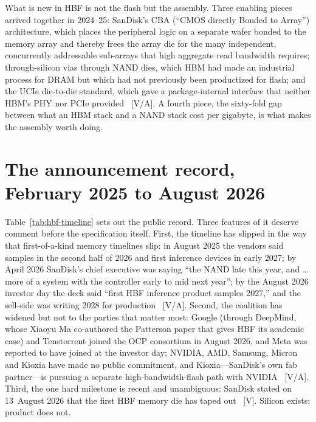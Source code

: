 What is new in HBF is not the flash but the assembly. Three enabling pieces arrived together in 2024--25: SanDisk's CBA (``CMOS directly Bonded to Array'') architecture, which places the peripheral logic on a separate wafer bonded to the memory array and thereby frees the array die for the many independent, concurrently addressable sub-arrays that high aggregate read bandwidth requires; through-silicon vias through NAND dies, which HBM had made an industrial process for DRAM but which had not previously been productized for flash; and the UCIe die-to-die standard, which gave a package-internal interface that neither HBM's PHY nor PCIe provided~\cite{sandisk-hbf-blog,hbf-semieng} [V/A]. A fourth piece, the sixty-fold gap between what an HBM stack and a NAND stack cost per gigabyte, is what makes the assembly worth doing.

\section{The announcement record, February 2025 to August 2026}

Table~\ref{tab:hbf-timeline} sets out the public record. Three features of it deserve comment before the specification itself. First, the timeline has slipped in the way that first-of-a-kind memory timelines slip: in August 2025 the vendors said samples in the second half of 2026 and first inference devices in early 2027; by April 2026 SanDisk's chief executive was saying ``the NAND late this year, and \ldots more of a system with the controller early to mid next year''; by the August 2026 investor day the deck said ``first HBF inference product samples 2027,'' and the sell-side was writing 2028 for production~\cite{sandisk-hbf-blog,hbf-q3call,hbf-investorday,hbf-tapeout} [V/A]. Second, the coalition has widened but not to the parties that matter most: Google (through DeepMind, whose Xiaoyu Ma co-authored the Patterson paper that gives HBF its academic case) and Tenstorrent joined the OCP consortium in August 2026, and Meta was reported to have joined at the investor day; NVIDIA, AMD, Samsung, Micron and Kioxia have made no public commitment, and Kioxia---SanDisk's own fab partner---is pursuing a separate high-bandwidth-flash path with NVIDIA~\cite{hbf-ocp,hbf-investorday,hbf-kioxia-tsv,hbf-toms-spec} [V/A]. Third, the one hard milestone is recent and unambiguous: SanDisk stated on 13~August 2026 that the first HBF memory die has taped out~\cite{hbf-investorday,hbf-tapeout} [V]. Silicon exists; product does not.

